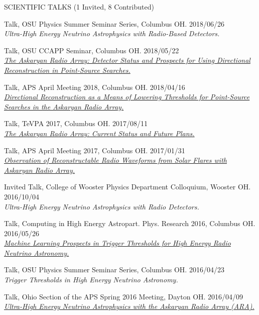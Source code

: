 \documentclass{resume} %
\begin{document}
\begin{rSection}{SCIENTIFIC TALKS (1 Invited, 8 Contributed)}
\begin{etaremune}

\item Talk, OSU Physics Summer Seminar Series, Columbus OH. \hfill 2018/06/26 \\
{\em Ultra-High Energy Neutrino Astrophysics with Radio-Based Detectors.} 

\item Talk, OSU CCAPP Seminar, Columbus OH. \hfill 2018/05/22 \\
\href{http://ccapp.osu.edu/pastseminars.html#past}{\textit{The Askaryan Radio Array: Detector Status and Prospects for Using Directional Reconstruction in Point-Source Searches.}}

\item Talk, APS April Meeting 2018, Columbus OH. \hfill 2018/04/16 \\
\href{http://meetings.aps.org/Meeting/APR18/Session/U17.7}{{\em Directional Reconstruction as a Means of Lowering Thresholds for Point-Source Searches in the Askaryan Radio Array.}}

\item Talk, TeVPA 2017, Columbus OH. \hfill 2017/08/11 \\
\href{http://indico.cern.ch/event/615891/contributions/2648790/}{{\em The Askaryan Radio Array: Current Status and Future Plans.} }

\item Talk, APS April Meeting 2017, Columbus OH. \hfill 2017/01/31 \\
\href{http://meetings.aps.org/Meeting/APR17/Session/Y3.2}{{\em Observation of Reconstructable Radio Waveforms from Solar Flares with Askaryan Radio Array.}}

\item Invited Talk, College of Wooster Physics Department Colloquium, Wooster OH. \hfill 2016/10/04 \\
{\em Ultra-High Energy Neutrino Astrophysics with Radio Detectors.}

\item Talk, Computing in High Energy Astropart. Phys. Research 2016, Columbus OH. \hfill 2016/05/26 \\
\href{http://ccapp.osu.edu/workshops/CHEAPR2016/workshop.html}{\em Machine Learning Prospects in Trigger Thresholds for High Energy Radio Neutrino Astronomy.}

\item Talk, OSU Physics Summer Seminar Series, Columbus OH. \hfill 2016/04/23 \\
{\em Trigger Thresholds in High Energy Neutrino Astronomy.} 

\item Talk, Ohio Section of the APS Spring 2016 Meeting, Dayton OH. \hfill 2016/04/09 \\
\href{http://meetings.aps.org/Meeting/OSS16/Session/D3.6}{\em Ultra-High Energy Neutrino Astrophysics with the Askaryan Radio Array (ARA).} 
 \end{etaremune}
\end{rSection}
\vspace{-0.10cm}
\end{document}
